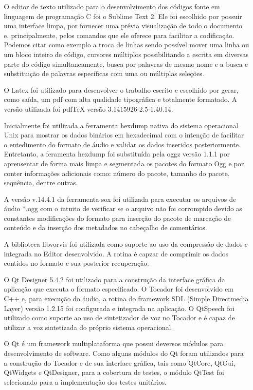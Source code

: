 O editor de texto utilizado para o desenvolvimento dos códigos fonte em linguagem de programação C foi o Sublime Text 2. Ele foi escolhido por possuir uma interface limpa, por fornecer uma prévia visualização de todo o documento e, principalmente, pelos comandos que ele oferece para facilitar a codificação. Podemos citar como exemplo a troca de linhas sendo possível mover uma linha ou um bloco inteiro de código, cursores múltiplos possibilitando a escrita em diversas parte do código simultaneamente, busca por palavras de mesmo nome e a busca e substituição de palavras específicas com uma ou múltiplas seleções.

O Latex foi utilizado para desenvolver o trabalho escrito e escolhido por gerar, como saída, um pdf com alta qualidade tipográfica e totalmente formatado. A versão utilizada foi pdfTeX versão 3.1415926-2.5-1.40.14.

Inicialmente foi utilizada a ferramenta hexdump nativa do sistema operacional Unix para mostrar os dados binários em hexadecimal com o intenção de facilitar o entedimento do formato de áudio e validar os dados inseridos posteriormente. Entretanto, a feramenta hexdump foi substituída pela oggz versão 1.1.1 por aprensentar de forma mais limpa e segmentada os pacotes do formato Ogg e por conter informações adicionais como: número do pacote, tamanho do pacote, sequência, dentre outras.

A versão v.14.4.1 da ferramenta sox foi utilizada para executar os arquivos de áudio *.ogg com o intuito de verificar se o arquivo não foi corrompido devido as constantes modificações do formato para inserção do pacote de marcação de conteúdo e da inserção dos metadados no cabeçalho de comentários.

A biblioteca libvorvis foi utilizada como suporte ao uso da compressão de dados e integrada no Editor desenvolvido. A rotina é capzar de comprimir os dados contidos no formato e sua posterior recuperação.

O Qt Designer 5.4.2 foi utilizado para a construção da interface gráfica da aplicação que executa o formato especificado. O Tocador foi desenvolvido em C++ e, para execução do áudio, a rotina do framework SDL (Simple Directmedia Layer) versão 1.2.15 foi configurada e integrada na aplicação. O QtSpeech foi utilizado como suporte ao uso de sintetizador de voz no Tocador e é capaz de utilizar a voz sintetizada do próprio sistema operacional.

O Qt é um framework multiplataforma que possui deversos módulos para desenvolvimento de software. Como alguns módulos do Qt foram utilizados para a construção do Tocador e de sua interface gráfica, tais como QtCore, QtGui, QtWidgets e QtDesigner, para a cobertura de testes, o módulo QtTest foi selecionado para a implementação dos testes unitários.

